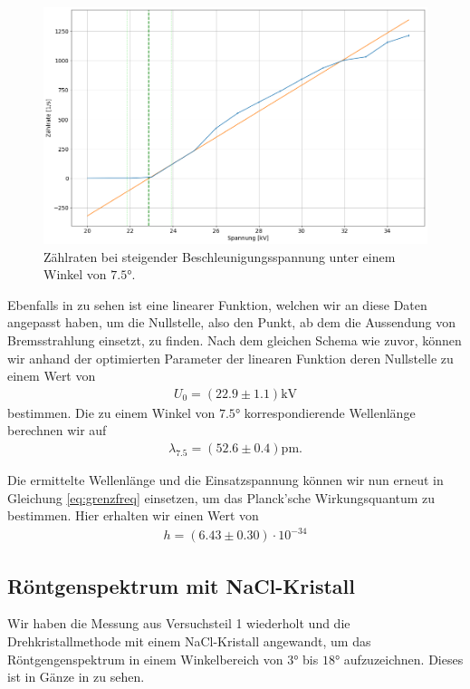 \begin{figure}[H]
  \centering
  \includegraphics[width=.9\textwidth]{files/plots/lif_ang75_volt_fit.png}
  \caption{Zählraten bei steigender Beschleunigungsspannung unter einem Winkel von $7.5\si{\degree}$.}
  \label{fig:lif_ang75_volt_fit}
\end{figure}

Ebenfalls in  zu sehen ist eine linearer Funktion, welchen wir an diese Daten angepasst haben, um die Nullstelle, also den Punkt, ab dem die Aussendung von Bremsstrahlung einsetzt, zu finden. Nach dem gleichen Schema wie zuvor, können wir anhand der optimierten Parameter der linearen Funktion deren Nullstelle zu einem Wert von
\begin{align}
  U_0 = (22.9 \pm 1.1)\si{\kilo\volt}
\end{align}
bestimmen. Die zu einem Winkel von $7.5\si{\degree}$ korrespondierende Wellenlänge berechnen wir auf
\begin{align}
  \lambda_{7.5} = (52.6 \pm 0.4)\si{\pico\meter}.
\end{align}

Die ermittelte Wellenlänge und die Einsatzspannung können wir nun erneut in Gleichung \eqref{eq:grenzfreq} einsetzen, um das Planck'sche Wirkungsquantum zu bestimmen. Hier erhalten wir einen Wert von
\begin{align}
  h = (6.43 \pm 0.30) \cdot 10^{-34}
\end{align}

\subsection{Röntgenspektrum mit NaCl-Kristall}

Wir haben die Messung aus Versuchsteil 1 wiederholt und die Drehkristallmethode mit einem NaCl-Kristall angewandt, um das Röntgengenspektrum in einem Winkelbereich von $3\si{\degree}$ bis $18\si{\degree}$ aufzuzeichnen. Dieses ist in Gänze in  zu sehen.

